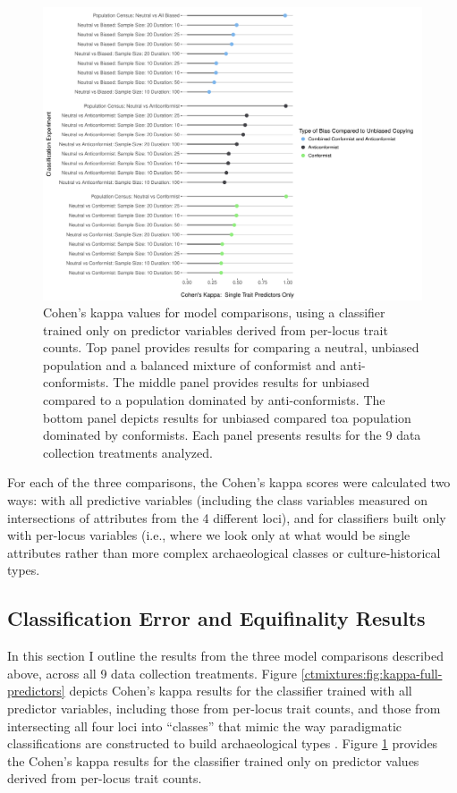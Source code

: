 \begin{figure}[p!]
\centering\includegraphics[scale=0.65]{graphics/ctmixtures/eq5-kappa-dotchart-perlocus-predictors.pdf}
\caption{Cohen's kappa values for model comparisons, using a classifier trained only on predictor variables derived from per-locus trait counts.  Top panel provides results for comparing a neutral, unbiased population and a balanced mixture of conformist and anti-conformists.  The middle panel provides results for unbiased compared to a population dominated by anti-conformists.  The bottom panel depicts results for unbiased compared toa population dominated by conformists.  Each panel presents results for the 9 data collection treatments analyzed.}
\label{ctmixtures:fig:kappa-perlocus-predictors}
\end{figure}

For each of the three comparisons, the Cohen's kappa scores were calculated two ways:  with all predictive variables (including the class variables measured on intersections of attributes from the 4 different loci), and for classifiers built only with per-locus variables (i.e., where we look only at what would be single attributes rather than more complex archaeological classes or culture-historical types.  

\subsection{Classification Error and Equifinality Results}

In this section I outline the results from the three model comparisons described above, across all 9 data collection treatments.  Figure \ref{ctmixtures:fig:kappa-full-predictors} depicts Cohen's kappa results for the classifier trained with all predictor variables, including those from per-locus trait counts, and those from intersecting all four loci into ``classes'' that mimic the way paradigmatic classifications are constructed to build archaeological types \citep{Dunnell1971}.  Figure \ref{ctmixtures:fig:kappa-perlocus-predictors} provides the Cohen's kappa results for the classifier trained only on predictor values derived from per-locus trait counts.  

